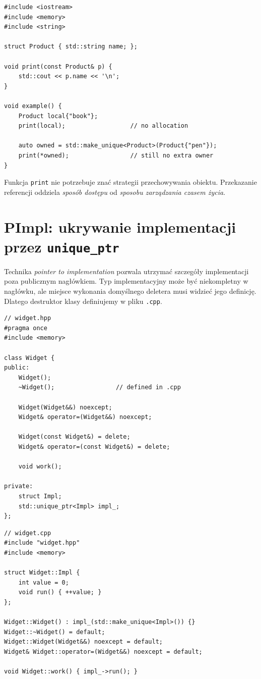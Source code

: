 \begin{lstlisting}
#include <iostream>
#include <memory>
#include <string>

struct Product { std::string name; };

void print(const Product& p) {
    std::cout << p.name << '\n';
}

void example() {
    Product local{"book"};
    print(local);                  // no allocation

    auto owned = std::make_unique<Product>(Product{"pen"});
    print(*owned);                 // still no extra owner
}
\end{lstlisting}

Funkcja \texttt{print} nie potrzebuje znać strategii
przechowywania obiektu. Przekazanie referencji oddziela
\emph{sposób dostępu} od \emph{sposobu zarządzania czasem życia}.

\section{PImpl: ukrywanie implementacji przez \texttt{unique\_ptr}}

Technika \emph{pointer to implementation} pozwala utrzymać
szczegóły implementacji poza publicznym nagłówkiem.
Typ implementacyjny może być niekompletny w nagłówku, ale
miejsce wykonania domyślnego deletera musi widzieć jego definicję.
Dlatego destruktor klasy definiujemy w pliku \texttt{.cpp}.

\begin{lstlisting}
// widget.hpp
#pragma once
#include <memory>

class Widget {
public:
    Widget();
    ~Widget();                 // defined in .cpp

    Widget(Widget&&) noexcept;
    Widget& operator=(Widget&&) noexcept;

    Widget(const Widget&) = delete;
    Widget& operator=(const Widget&) = delete;

    void work();

private:
    struct Impl;
    std::unique_ptr<Impl> impl_;
};
\end{lstlisting}

\begin{lstlisting}
// widget.cpp
#include "widget.hpp"
#include <memory>

struct Widget::Impl {
    int value = 0;
    void run() { ++value; }
};

Widget::Widget() : impl_(std::make_unique<Impl>()) {}
Widget::~Widget() = default;
Widget::Widget(Widget&&) noexcept = default;
Widget& Widget::operator=(Widget&&) noexcept = default;

void Widget::work() { impl_->run(); }
\end{lstlisting}

